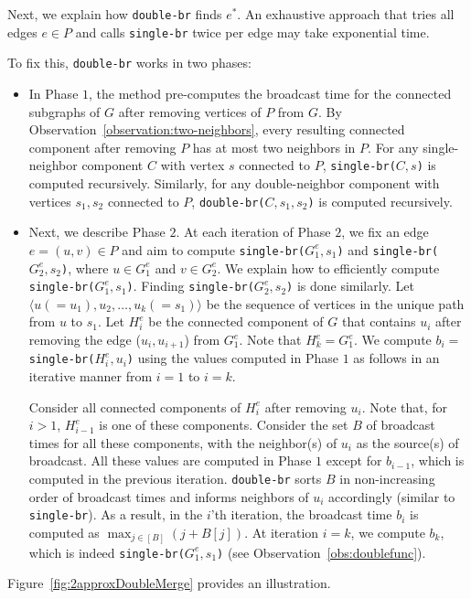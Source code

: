 \documentclass[letterpaper,11pt]{article}
\newcommand{\singlefunc}[1]{\texttt{single-br(#1)}\xspace}
\newcommand{\doublefunc}[1]{\texttt{double-br(#1)}\xspace}
\newcommand{\singlefuncc}{\texttt{single-br}\xspace}
\newcommand{\doublefuncc}{\texttt{double-br}\xspace}
\begin{document}
Next, we explain how \doublefuncc finds $e^*$. An exhaustive approach that 
tries all edges $e\in P$ and calls \singlefuncc twice per edge may take exponential time. 

To fix this, 
\doublefuncc works in two phases:
\begin{itemize}
    \item In {Phase} ${1}$, the method pre-computes the broadcast time for the connected subgraphs of $G$ after removing vertices of $P$ from $G$. By Observation~\ref{observation:two-neighbors}, 
every resulting connected component after removing $P$ has at most two neighbors in $P$. For any single-neighbor component $C$ with vertex $s$ connected to $P$, \singlefunc{$C,s$} is computed recursively. Similarly, for any double-neighbor component with vertices $s_1, s_2$ connected to $P$,  \doublefunc{$C,s_1,s_2$} is computed recursively. 


\item Next, we describe {Phase} ${2}$. At each iteration of Phase $2$, we fix an edge $e=(u,v) \in P$ and aim to compute \singlefunc{$G_1^e,s_1$} and \singlefunc{$G_2^e,s_2$}, where $u\in G_1^e$ and $v\in G_2^e$. 
We explain how to efficiently compute \singlefunc{$G_1^e,s_1$}. Finding \singlefunc{$G_2^e,s_2$} is done similarly. 
Let $\langle u(=u_1), u_2, \ldots, u_k(=s_1)\rangle$ be the sequence of vertices in the unique path from $u$ to $s_1$.
Let $H^e_{i}$ be the connected component of $G$ that contains $u_i$ after removing the edge ($u_i, u_{i+1}$) from $G_1^e$. 
Note that $H^e_k = G_1^e$. 
We compute $b_i=$\singlefunc{$H^e_i, u_i$} using the values computed in Phase $1$ as follows in an iterative manner from $i=1$ to $i=k$. 

Consider all connected components of $H^e_i$ after removing $u_i$. Note that, for $i>1$, $H^e_{i-1}$ is one of these components. 
Consider the set $B$ of broadcast times for all these components, 
with the neighbor(s) of $u_i$ as the source(s) of broadcast. All these values are computed in Phase $1$ except for $b_{i-1}$, which is computed in the previous iteration. \doublefuncc sorts $B$ in non-increasing order of broadcast times and informs neighbors of $u_i$ accordingly (similar to \singlefuncc). As a result, in the $i$'th iteration, the broadcast time $b_i$ is computed as $\max_{j \in [B]} (j+B[j]) $. At iteration $i=k$, 
we compute $b_k$, which is indeed \singlefunc{$G^e_1, s_1$} (see Observation~\ref{obs:doublefunc}).
\end{itemize}
Figure~\ref{fig:2approxDoubleMerge} provides an illustration. 
\end{document}

